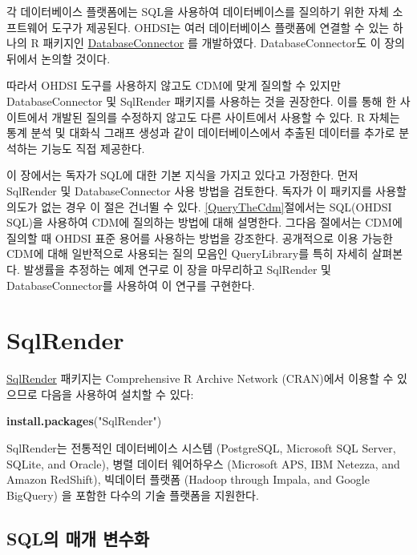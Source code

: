 \documentclass[11pt]{book}
\newenvironment{Shaded}{\begin{snugshade}}{\end{snugshade}}
\newcommand{\KeywordTok}[1]{\textcolor[rgb]{0.13,0.29,0.53}{\textbf{#1}}}
\newcommand{\StringTok}[1]{\textcolor[rgb]{0.31,0.60,0.02}{#1}}
\newcommand{\NormalTok}[1]{#1}
\theoremstyle{definition}
\theoremstyle{definition}
\theoremstyle{definition}
\theoremstyle{remark}
\begin{document}
각 데이터베이스 플랫폼에는 SQL을 사용하여 데이터베이스를 질의하기 위한
자체 소프트웨어 도구가 제공된다. OHDSI는 여러 데이터베이스 플랫폼에
연결할 수 있는 하나의 R 패키지인
\href{https://ohdsi.github.io/DatabaseConnector/}{DatabaseConnector} 를
개발하였다. DatabaseConnector도 이 장의 뒤에서 논의할 것이다.

따라서 OHDSI 도구를 사용하지 않고도 CDM에 맞게 질의할 수 있지만
DatabaseConnector 및 SqlRender 패키지를 사용하는 것을 권장한다. 이를
통해 한 사이트에서 개발된 질의를 수정하지 않고도 다른 사이트에서 사용할
수 있다. R 자체는 통계 분석 및 대화식 그래프 생성과 같이
데이터베이스에서 추출된 데이터를 추가로 분석하는 기능도 직접 제공한다.

이 장에서는 독자가 SQL에 대한 기본 지식을 가지고 있다고 가정한다. 먼저
SqlRender 및 DatabaseConnector 사용 방법을 검토한다. 독자가 이 패키지를
사용할 의도가 없는 경우 이 절은 건너뛸 수 있다.
\ref{QueryTheCdm}절에서는 SQL(OHDSI SQL)을 사용하여 CDM에 질의하는
방법에 대해 설명한다. 그다음 절에서는 CDM에 질의할 때 OHDSI 표준 용어를
사용하는 방법을 강조한다. 공개적으로 이용 가능한 CDM에 대해 일반적으로
사용되는 질의 모음인 QueryLibrary를 특히 자세히 살펴본다. 발생률을
추정하는 예제 연구로 이 장을 마무리하고 SqlRender 및 DatabaseConnector를
사용하여 이 연구를 구현한다. 

\hypertarget{SqlRender}{\section{SqlRender}\label{SqlRender}}

\href{https://ohdsi.github.io/SqlRender/}{SqlRender} 패키지는
Comprehensive R Archive Network (CRAN)에서 이용할 수 있으므로 다음을
사용하여 설치할 수 있다:

\begin{Shaded}
\begin{Highlighting}[]
\KeywordTok{install.packages}\NormalTok{(}\StringTok{"SqlRender"}\NormalTok{)}
\end{Highlighting}
\end{Shaded}

SqlRender는 전통적인 데이터베이스 시스템 (PostgreSQL, Microsoft SQL
Server, SQLite, and Oracle), 병렬 데이터 웨어하우스 (Microsoft APS, IBM
Netezza, and Amazon RedShift), 빅데이터 플랫폼 (Hadoop through Impala,
and Google BigQuery) 을 포함한 다수의 기술 플랫폼을 지원한다.

\subsection{SQL의 매개 변수화}\label{sql--}
\end{document}
